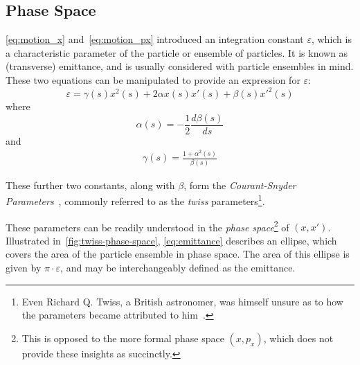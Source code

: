 \documentclass[11pt]{report}
\begin{document}
\subsection{Phase Space}

\autoref{eq:motion_x} and~\autoref{eq:motion_px} introduced an integration constant $\varepsilon$, which is a characteristic parameter of the particle or ensemble of particles. It is known as (transverse) emittance, and is usually considered with particle ensembles in mind. These two equations can be manipulated to provide an expression for $\varepsilon$:
\begin{equation}
  \varepsilon = \gamma(s)x^2(s)+2\alpha x(s)x'(s)+\beta(s)x'^2(s)
  \label{eq:emittance}
\end{equation} where 
\begin{equation}
  \alpha(s) = -\frac12\frac{d\beta(s)}{ds}
  \label{eq:alpha}
\end{equation} and
\begin{eqnarray}
  \gamma(s) = \frac{1+\alpha^2(s)}{\beta(s)}
  \label{eq:gamma}
\end{eqnarray}

These further two constants, along with $\beta$, form the \textit{Courant-Snyder Parameters}~\cite{courantsnyder}, commonly referred to as the \textit{twiss} parameters\footnote{Even Richard Q. Twiss, a British astronomer, was himself unsure as to how the parameters became attributed to him~\cite{richardtwiss}.}. 

These parameters can be readily understood in the \textit{phase space}\footnote{This is opposed to the more formal phase space $(x, p_x)$, which does not provide these insights as succinctly.} of $(x, x')$. Illustrated in~\autoref{fig:twiss-phase-space}, \autoref{eq:emittance} describes an ellipse, which covers the area of the particle ensemble in phase space. The area of this ellipse is given by $\pi\cdot\varepsilon$, and may be interchangeably defined as the emittance. 
\end{document}
